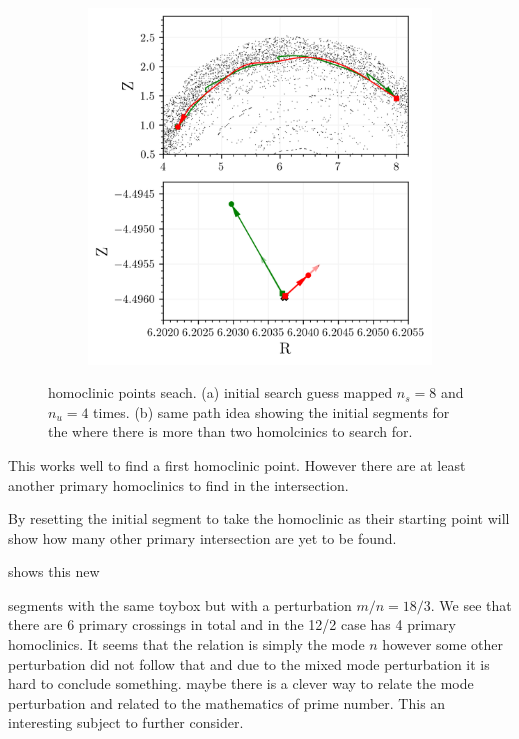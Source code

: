 \begin{figure}[h!]
\begin{subfigure}[c]{0.58\textwidth}
        \includegraphics[width=\textwidth]{images/clinicsearch/search_domain.png}
        \caption{}
        \label{fig:clinic-search-b}
    \end{subfigure}
    \caption{homoclinic points seach. (a) initial search guess mapped $n_s = 8$ and $n_u = 4$ times. (b) same path idea showing the initial segments for the where there is more than two homolcinics to search for.}
    \label{fig:clinic-search}
\end{figure}

This works well to find a first homoclinic point. However there are at least another primary homoclinics to find in the intersection. 

By resetting the initial segment to take the homoclinic as their starting point will show how many other primary intersection are yet to be found. 

 shows this new 

segments with the same toybox but with a perturbation $m/n = 18/3$. We see that there are 6 primary crossings in total and in the 12/2 case has 4 primary homoclinics. It seems that the relation is simply the mode $n$ however some other perturbation did not follow that and due to the mixed mode perturbation it is hard to conclude something. maybe there is a clever way to relate  the mode perturbation and related to the mathematics of prime number. This an interesting subject to further consider.

